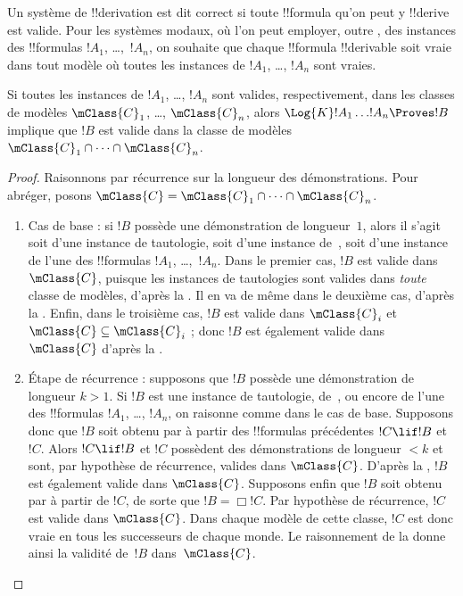 \documentclass[../../../include/open-logic-section]{subfiles}
\begin{document}


Un système de !!{derivation} est dit correct si toute !!{formula}
qu'on peut y !!{derive} est valide. Pour les systèmes modaux, où l'on
peut employer, outre , des instances des !!{formula}s
$!A_1$, \dots,~$!A_n$, on souhaite que chaque !!{formula}
!!{derivable} soit vraie dans tout modèle où toutes les instances de
$!A_1$, \dots, $!A_n$ sont vraies.

\begin{thm}
  Si toutes les instances de $!A_1$, \dots, $!A_n$ sont valides,
  respectivement, dans les classes de modèles $\mClass{C}_1$, \dots,
  $\mClass{C}_n$, alors $\Log{K}!A_1\dots !A_n \Proves !B$ implique
  que $!B$ est valide dans la classe de modèles
  $\mClass{C}_1 \cap \dots \cap \mClass{C}_n$.
\end{thm}

\begin{proof}
  Raisonnons par récurrence sur la longueur des démonstrations. Pour
  abréger, posons $\mClass{C} = \mClass{C}_1 \cap \dots \cap
  \mClass{C}_n$.
  \begin{enumerate}
  \item Cas de base : si $!B$ possède une démonstration de
    longueur~$1$, alors il s'agit soit d'une instance de tautologie, soit
    d'une instance de~, soit
    d'une instance de l'une des !!{formula}s $!A_1$, \dots,~$!A_n$.
    Dans le premier cas, $!B$ est valide dans $\mClass{C}$, puisque
    les instances de tautologies sont valides dans \emph{toute}
    classe de modèles, d'après la .
    Il en va de même dans le deuxième cas, d'après la
    . Enfin, dans le troisième
    cas, $!B$ est valide dans $\mClass{C}_i$ et
    $\mClass{C} \subseteq \mClass{C}_i$ ; donc $!B$ est également
    valide dans $\mClass{C}$ d'après la
    .
  \item Étape de récurrence : supposons que $!B$ possède une
    démonstration de longueur $k>1$. Si $!B$ est une instance de
    tautologie, de~, ou
    encore de l'une des !!{formula}s $!A_1$, \dots, $!A_n$, on
    raisonne comme dans le cas de base. Supposons donc que $!B$ soit
    obtenu par \MP{} à partir des !!{formula}s précédentes
    $!C \lif !B$ et $!C$. Alors $!C \lif !B$ et $!C$ possèdent des
    démonstrations de longueur $<k$ et sont, par hypothèse de
    récurrence, valides dans
    $\mClass{C}$. D'après la , $!B$ est
    également valide dans $\mClass{C}$. Supposons enfin que $!B$ soit obtenu par
    \Nec{} à partir de $!C$, de sorte que $!B = \Box!C$. Par
    hypothèse de récurrence, $!C$ est valide dans $\mClass{C}$.
    Dans chaque modèle de cette classe, $!C$ est donc vraie en
    tous les successeurs de chaque monde. Le raisonnement de la
     donne ainsi la validité de~$!B$
    dans~$\mClass{C}$.
  \end{enumerate}
\end{proof}
\end{document}
